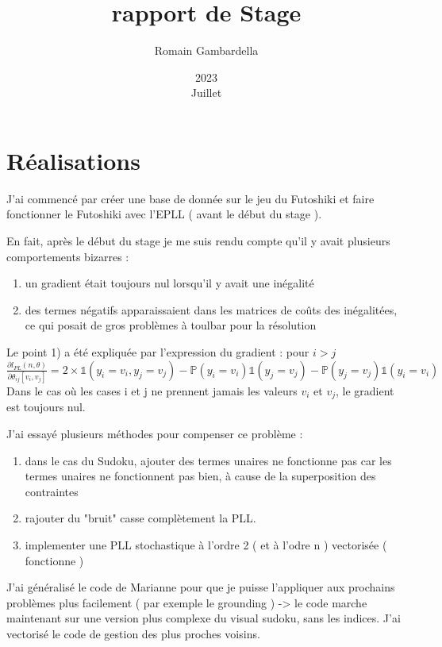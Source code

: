 \documentclass[11 pt]{article}
\begin{document}
\newtheorem{theorem}{Theorem}
\title{rapport de Stage}
\date{2023\\ Juillet}
\author{Romain Gambardella}
\maketitle
\section{Réalisations}

J'ai commencé par créer une base de donnée sur le jeu du Futoshiki et faire fonctionner le Futoshiki avec l'EPLL ( avant le début du stage ).

En fait, après le début du stage je me suis rendu compte qu'il y avait plusieurs comportements bizarres : 
\begin{enumerate}
	\item un gradient était toujours nul lorsqu'il y avait une inégalité
	\item des termes négatifs apparaissaient dans les matrices de coûts des inégalitées, ce qui posait de gros problèmes à toulbar pour la résolution
\end{enumerate}
Le point 1) a été expliquée par l'expression du gradient : 
pour $i > j $ \\
$\frac{\partial l_{PL}(n, \theta )}{\partial \theta_{ij}[v_i,v_j]} = 2 \times \mathbb{1}(y_i = v_i, y_j = v_j) - \mathbb{P}(y_i=v_i) \mathbb{1}(y_j = v_j ) -   \mathbb{P}(y_j=v_j) \mathbb{1}(y_i = v_i ) $
Dans le cas où les cases i et j ne prennent jamais les valeurs $v_i$ et $v_j$, le gradient est toujours nul.

J'ai essayé plusieurs méthodes pour compenser ce problème : 
\begin{enumerate}
	\item dans le cas du Sudoku, ajouter des termes unaires ne fonctionne pas car les termes unaires ne fonctionnent pas bien, à cause de la superposition des contraintes
	\item rajouter du "bruit" casse complètement la PLL.
	\item implementer une PLL stochastique à l'ordre 2 ( et à l'odre n ) vectorisée ( fonctionne ) 
\end{enumerate}

J'ai généralisé le code de Marianne pour que je puisse l'appliquer aux prochains problèmes plus facilement ( par exemple le grounding ) -> le code marche maintenant sur une version plus complexe du visual sudoku, sans les indices.
J'ai vectorisé le code de gestion des plus proches voisins.
\end{document}
